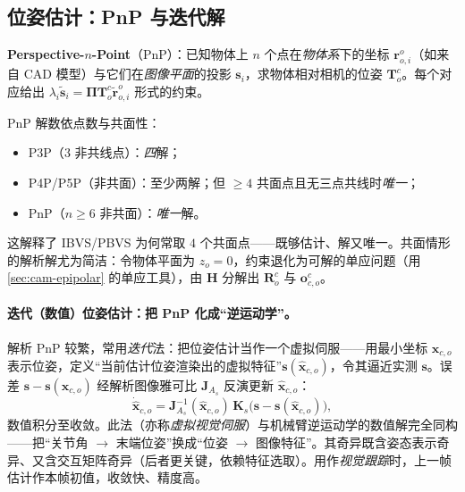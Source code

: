 \subsection{位姿估计：PnP 与迭代解}
\label{sec:vs-pbvs-pnp}

\begin{definition}[PnP 问题]\label{def:vs-pnp}
\textbf{Perspective-$n$-Point}（PnP）：已知物体上 $n$ 个点在\emph{物体系}下的坐标 $\mathbf{r}_{o,i}^o$（如来自 CAD 模型）与它们在\emph{图像平面}的投影 $\mathbf{s}_i$，求物体相对相机的位姿 $\mathbf{T}_o^c$\cite{siciliano2009robotics}。每个对应给出 $\lambda_i\widetilde{\mathbf{s}}_i=\boldsymbol{\Pi}\mathbf{T}_o^c\widetilde{\mathbf{r}}_{o,i}^o$ 形式的约束。
\end{definition}

\begin{note}\label{note:vs-pnp-solutions}
PnP 解数依点数与共面性\cite{siciliano2009robotics}：
\begin{itemize}
  \item P3P（$3$ 非共线点）：\emph{四}解；
  \item P4P/P5P（非共面）：至少两解；但 $\ge4$ 共面点且无三点共线时\emph{唯一}；
  \item PnP（$n\ge6$ 非共面）：\emph{唯一}解。
\end{itemize}
这解释了 IBVS/PBVS 为何常取 $4$ 个共面点——既够估计、解又唯一。共面情形的解析解尤为简洁：令物体平面为 $z_o=0$，约束退化为可解的单应问题（用 \cref{sec:cam-epipolar} 的单应工具），由 $\mathbf{H}$ 分解出 $\mathbf{R}_o^c$ 与 $\mathbf{o}_{c,o}^c$。
\end{note}

\paragraph{迭代（数值）位姿估计：把 PnP 化成“逆运动学”。}
解析 PnP 较繁，常用\emph{迭代}法\cite{siciliano2009robotics}：把位姿估计当作一个虚拟伺服——用最小坐标 $\mathbf{x}_{c,o}$ 表示位姿，定义“当前估计位姿渲染出的虚拟特征”$\mathbf{s}(\widehat{\mathbf{x}}_{c,o})$，令其逼近实测 $\mathbf{s}$。误差 $\mathbf{s}-\mathbf{s}(\widehat{\mathbf{x}}_{c,o})$ 经解析图像雅可比 $\mathbf{J}_{A_s}$ 反演更新 $\widehat{\mathbf{x}}_{c,o}$：
\begin{equation}
  \dot{\widehat{\mathbf{x}}}_{c,o}=\mathbf{J}_{A_s}^{-1}(\widehat{\mathbf{x}}_{c,o})\,\mathbf{K}_s\big(\mathbf{s}-\mathbf{s}(\widehat{\mathbf{x}}_{c,o})\big),
  \label{eq:vs-virtual-vs}
\end{equation}
数值积分至收敛。此法（亦称\emph{虚拟视觉伺服}）与机械臂逆运动学的数值解完全同构——把“关节角 $\to$ 末端位姿”换成“位姿 $\to$ 图像特征”\cite{siciliano2009robotics}。其奇异既含姿态表示奇异、又含交互矩阵奇异（后者更关键，依赖特征选取）。用作\emph{视觉跟踪}时，上一帧估计作本帧初值，收敛快、精度高。

